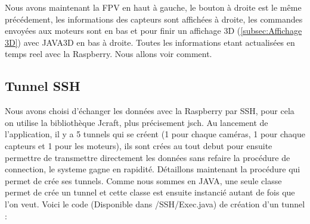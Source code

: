 \documentclass[a4paper,11pt]{report}
\begin{document}
				\newline Nous avons maintenant la FPV en haut à gauche, le bouton à droite est le même précédement, les informations des capteurs sont affichées à droite, les commandes envoyées aux moteurs sont en bas et pour finir un affichage 3D (\ref{subsec:Affichage 3D}) avec JAVA3D en bas à droite. Toutes les informations etant actualisées en temps reel avec la Raspberry. Nous allons voir comment.
		\subsection{Tunnel SSH}
			Nous avons choisi d'échanger les données avec la Raspberry par SSH, pour cela on utilise la bibliothèque Jcraft, plus précisement jsch. Au lancement de l'application, il y a 5 tunnels qui se créent (1 pour chaque caméras, 1 pour chaque capteurs et 1 pour les moteurs), ils sont crées au tout debut pour ensuite permettre de transmettre directement les données sans refaire la procédure de connection, le systeme gagne en rapidité. 
			\newline Détaillons maintenant la procédure qui permet de crée ses tunnels. Comme nous sommes en JAVA, une seule classe permet de crée un tunnel et cette classe est ensuite instancié autant de fois que l'on veut.
			\newline Voici le code (Disponible dans /SSH/Exec.java) de création d'un tunnel :
			
\end{document}
